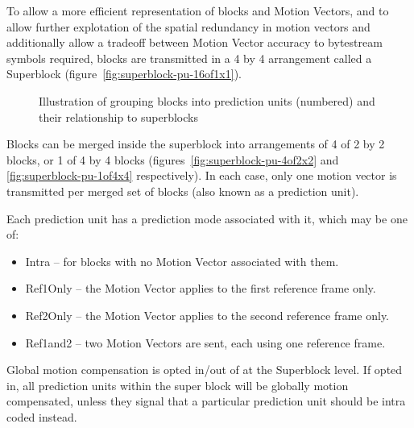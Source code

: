 
To allow a more efficient representation of blocks and Motion Vectors,
and to allow further explotation of the spatial redundancy in motion
vectors and additionally allow a tradeoff between Motion Vector accuracy
to bytestream symbols required, blocks are transmitted in a 4 by 4
arrangement called a Superblock (figure~\ref{fig:superblock-pu-16of1x1}).

\begin{figure}
    \centering
    \hspace{0.5in}
    \hspace{0.5in}
    \caption{Illustration of grouping blocks into prediction units
    (numbered) and their relationship to superblocks}
    \label{fig:superblock-pu}
\end{figure}

Blocks can be merged inside the superblock into arrangements of 4 of 2 by 2
blocks, or 1 of 4 by 4 blocks (figures~\ref{fig:superblock-pu-4of2x2} and
\ref{fig:superblock-pu-1of4x4} respectively).  In each
case, only one motion vector is transmitted per merged set of blocks
(also known as a prediction unit).

Each prediction unit has a prediction mode associated with it, which may
be one of:
\begin{itemize}
    \item Intra -- for blocks with no Motion Vector associated with
        them.
    \item Ref1Only -- the Motion Vector applies to the first reference frame
        only.
    \item Ref2Only -- the Motion Vector applies to the second reference
        frame only.
    \item Ref1and2 -- two Motion Vectors are sent, each using one
        reference frame.
\end{itemize}

Global motion compensation is opted in/out of at the Superblock level.
If opted in, all prediction units within the super block will be
globally motion compensated, unless they signal that a particular
prediction unit should be intra coded instead.


